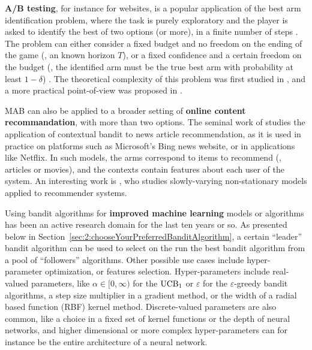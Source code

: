 %
    \textbf{A/B testing}, for instance for websites, is a popular application of the best arm identification problem,
    where the task is purely exploratory and the player is asked to identify the best of two options (or more), in a finite number of steps \cite{audibert2010best}.
    The problem can either consider a fixed budget and no freedom on the ending of the game (\ie, an known horizon $T$), or a fixed confidence and a certain freedom on the budget (\ie, the identified arm must be the true best arm with probability at least $1-\delta$) \cite{Garivier16BAI}.
    The theoretical complexity of this problem
    was first studied in \cite{Kaufmann14},
    and a more practical point-of-view was proposed in \cite{Jamieson17ABTest}.

    MAB can also be applied to a broader setting of \textbf{online content recommandation},
    with more than two options.
    The seminal work of \cite{Li10} studies the application of contextual bandit to news article recommendation, as it is used in practice on platforms such as Microsoft's Bing news website,
    or in applications like Netflix.
    In such models, the arms correspond to items to recommend (\eg, articles or movies), and the contexts contain features about each user of the system.
    An interesting work is \cite{Louedec16}, who studies slowly-varying non-stationary models applied to recommender systems.

    Using bandit algorithms for \textbf{improved machine learning} models or algorithms has been an active research domain for the last ten years or so.
    As presented below in Section~\ref{sec:2:chooseYourPreferredBanditAlgorithm}, a certain ``leader'' bandit algorithm can be used to select on the run the best bandit algorithm from a pool of ``followers'' algorithms.
    Other possible use cases include hyper-parameter optimization, or features selection.
    Hyper-parameters include real-valued parameters, like $\alpha\in[0,\infty)$ for the $\mathrm{UCB}_1$ or $\varepsilon$ for the $\varepsilon$-greedy bandit algorithms, a step size multiplier in a gradient method, or the width of a radial based function (RBF) kernel method.
    Discrete-valued parameters are also common, like a choice in a fixed set of kernel functions or the depth of neural networks,
    and higher dimensional or more complex hyper-parameters can for instance be the entire architecture of a neural network.

